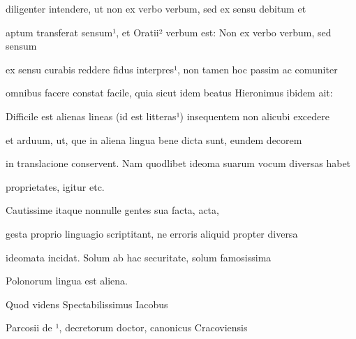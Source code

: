 \fulllines{}

diligenter intendere, ut non ex verbo verbum, sed ex sensu debitum et



aptum transferat sensum¹, et Oratii² verbum est: Non ex verbo verbum, sed sensum
%

ex sensu curabis reddere fidus interpres¹, non tamen hoc passim ac comuniter

omnibus facere constat facile, quia sicut idem beatus Hieronimus ibidem ait:

Difficile est alienas lineas (id est litteras¹) insequentem non alicubi excedere

et arduum, ut, que in aliena lingua bene dicta sunt, eundem decorem

in translacione conservent. Nam quodlibet ideoma suarum vocum diversas habet

\splitlines{}

proprietates, igitur etc.

\indentK Cautissime itaque nonnulle gentes sua facta, acta,

\fulllines{}

gesta proprio linguagio scriptitant, ne erroris aliquid propter diversa

ideomata incidat. Solum ab hac securitate, solum famosissima

\splitlines{}

Polonorum lingua est aliena.

\indentK Quod videns Spectabilissimus Iacobus

\fulllines{}


\newpage
{}

Parcosii de ¹, decretorum doctor, canonicus Cracoviensis

